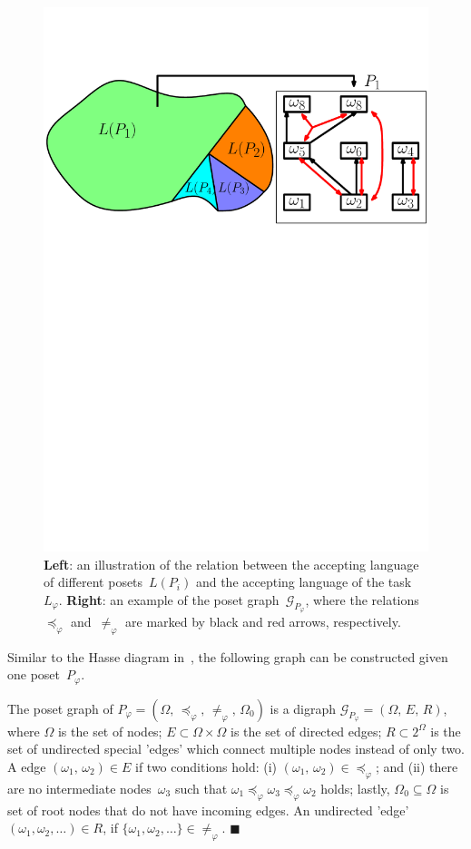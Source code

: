 \begin{figure}[t!]
	\includegraphics[width=0.85\linewidth]{figures/poset_language2.pdf}
	\centering
\caption{\textbf{Left}:
an illustration of the relation between the accepting
language of different posets~$L(P_i)$
and the accepting language of the task~$L_\varphi$.
\textbf{Right}:
an example of the poset graph~$\mathcal{G}_{P_\varphi}$,
where the relations~$\preceq_{\varphi}$ and~$\neq_{\varphi}$
are marked by black and red arrows, respectively.}
\label{fig:poset_language}
\end{figure}

Similar to the Hasse diagram in~\citep{simovici2008mathematical},
the following graph can be constructed given one poset~$P_{\varphi}$.

\begin{definition}\label{def:poset-graph}
The poset graph of $P_{\varphi}=(\Omega,\,\preceq_{\varphi},\,\neq_{\varphi},
\,\Omega_0)$ is a digraph $\mathcal{G}_{P_\varphi}=(\Omega,\,E,\,R)$,
where $\Omega$ is the set of nodes;
$E\subset \Omega \times \Omega$ is the set of directed edges;
$R\subset 2^\Omega$ is the set of undirected special 'edges' which
connect multiple nodes instead of only two.
A edge $(\omega_1,\,\omega_2)\in E$ if two conditions hold:
(i) $(\omega_1,\, \omega_2)\in \preceq_{\varphi}$;
{and} (ii) there are no intermediate nodes~$\omega_3$ such that
$\omega_1\preceq_{\varphi} \omega_3 \preceq_{\varphi} \omega_2$ holds;
lastly, $\Omega_0\subseteq \Omega$ is set of root nodes that do not have
incoming edges. An undirected 'edge' $(\omega_1,\omega_2,\dots)\in R$, if $\{\omega_1,\omega_2,\dots\}\in \neq_{\varphi}$.
\hfill $\blacksquare$
 \end{definition}

